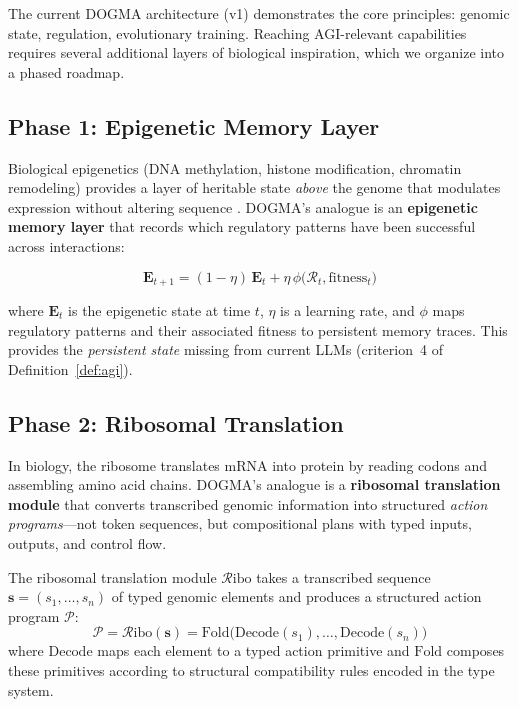 The current DOGMA architecture (v1) demonstrates the core principles: genomic state, regulation, evolutionary training. Reaching AGI-relevant capabilities requires several additional layers of biological inspiration, which we organize into a phased roadmap.

\subsection{Phase 1: Epigenetic Memory Layer}
\label{sec:epigenetic-memory}

Biological epigenetics (DNA methylation, histone modification, chromatin remodeling) provides a layer of heritable state \emph{above} the genome that modulates expression without altering sequence \citep{allis2016}. DOGMA's analogue is an \textbf{epigenetic memory layer} that records which regulatory patterns have been successful across interactions:

\begin{equation}
\mathbf{E}_{t+1} = (1 - \eta)\,\mathbf{E}_t + \eta\,\phi\bigl(\mathcal{R}_t, \text{fitness}_t\bigr)
\label{eq:epigenetic-update}
\end{equation}

where $\mathbf{E}_t$ is the epigenetic state at time $t$, $\eta$ is a learning rate, and $\phi$ maps regulatory patterns and their associated fitness to persistent memory traces. This provides the \emph{persistent state} missing from current LLMs (criterion~4 of Definition~\ref{def:agi}).

\subsection{Phase 2: Ribosomal Translation}
\label{sec:ribosomal}

In biology, the ribosome translates mRNA into protein by reading codons and assembling amino acid chains. DOGMA's analogue is a \textbf{ribosomal translation module} that converts transcribed genomic information into structured \emph{action programs}---not token sequences, but compositional plans with typed inputs, outputs, and control flow.

\begin{dogmadef}
The ribosomal translation module $\mathcal{R}\text{ibo}$ takes a transcribed sequence $\mathbf{s} = (s_1, \ldots, s_n)$ of typed genomic elements and produces a structured action program $\mathcal{P}$:
\begin{equation}
\mathcal{P} = \mathcal{R}\text{ibo}(\mathbf{s}) = \text{Fold}\bigl(\text{Decode}(s_1), \ldots, \text{Decode}(s_n)\bigr)
\end{equation}
where $\text{Decode}$ maps each element to a typed action primitive and $\text{Fold}$ composes these primitives according to structural compatibility rules encoded in the type system.
\end{dogmadef}

